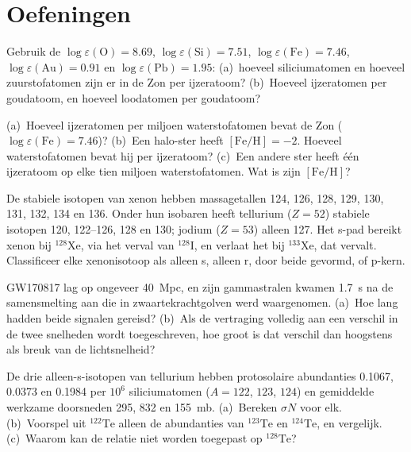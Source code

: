 \section{Oefeningen}

\begin{exercise}[$\star$]\label{exo:b3:origin-of-elements:1}
Gebruik de  $\log\varepsilon(\mathrm{O}) = 8.69$,
$\log\varepsilon(\mathrm{Si}) = 7.51$, $\log\varepsilon(\mathrm{Fe}) =
7.46$, $\log\varepsilon(\mathrm{Au}) = 0.91$ en
$\log\varepsilon(\mathrm{Pb}) = 1.95$: (a)~hoeveel siliciumatomen en
hoeveel zuurstofatomen zijn er in de Zon per ijzeratoom? (b)~Hoeveel
ijzeratomen per goudatoom, en hoeveel loodatomen per goudatoom?
\end{exercise}

\begin{exercise}[$\star$]\label{exo:b3:origin-of-elements:2}
(a)~Hoeveel ijzeratomen per miljoen waterstofatomen bevat de Zon
($\log\varepsilon(\mathrm{Fe}) = 7.46$)? (b)~Een halo-ster heeft
$[\mathrm{Fe/H}] = -2$. Hoeveel waterstofatomen bevat hij per ijzeratoom?
(c)~Een andere ster heeft één ijzeratoom op elke tien miljoen
waterstofatomen. Wat is zijn $[\mathrm{Fe/H}]$?
\end{exercise}

\begin{exercise}[$\star$]\label{exo:b3:origin-of-elements:3}
De stabiele isotopen van xenon hebben massagetallen 124, 126, 128, 129, 130,
131, 132, 134 en 136. Onder hun isobaren heeft tellurium ($Z = 52$)
stabiele isotopen 120, 122--126, 128 en 130; jodium ($Z = 53$) alleen 127.
Het s-pad bereikt xenon bij $^{128}\mathrm{Xe}$, via het verval van
$^{128}\mathrm{I}$, en verlaat het bij $^{133}\mathrm{Xe}$, dat vervalt.
Classificeer elke xenonisotoop als alleen s, alleen r, door beide
gevormd, of p-kern.
\end{exercise}

\begin{exercise}[$\star$]\label{exo:b3:origin-of-elements:4}
GW170817 lag op ongeveer \qty{40}{Mpc}, en zijn gammastralen kwamen
\qty{1.7}{s} na de samensmelting aan die in zwaartekrachtgolven werd
waargenomen. (a)~Hoe lang hadden beide signalen gereisd? (b)~Als de
vertraging volledig aan een verschil in de twee snelheden wordt
toegeschreven, hoe groot is dat verschil dan hoogstens als breuk van de lichtsnelheid?
\end{exercise}

\begin{exercise}[$\star\star$]\label{exo:b3:origin-of-elements:5}
De drie alleen-s-isotopen van tellurium hebben protosolaire abundanties
\num{0.1067}, \num{0.0373} en \num{0.1984} per $10^6$ siliciumatomen
($A = 122$, $123$, $124$) en gemiddelde werkzame doorsneden \num{295},
\num{832} en \qty{155}{mb}. (a)~Bereken $\sigma N$ voor elk. (b)~Voorspel
uit $^{122}\mathrm{Te}$ alleen de abundanties van $^{123}\mathrm{Te}$
en $^{124}\mathrm{Te}$, en vergelijk. (c)~Waarom kan de relatie niet
worden toegepast op $^{128}\mathrm{Te}$?
\end{exercise}

